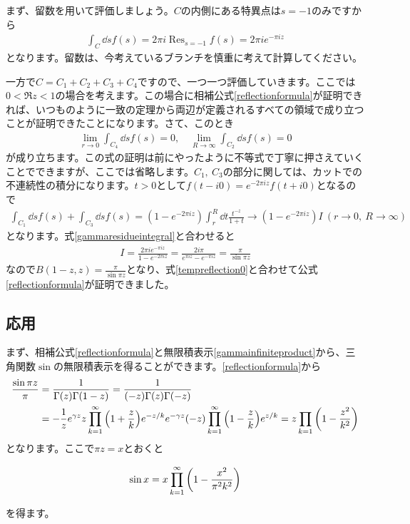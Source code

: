 \documentclass[report,paper=a4, fontsize=12pt, line_length=16cm, number_of_lines=33,dvipdfmx]{jlreq}
\newenvironment{important}{\begin{tcolorbox}[
  colback = white,
  colframe = red!35,
  boxrule = 2mm,
  fonttitle = \bfseries,
  after = \noindent] }{\end{tcolorbox}}
\numberwithin{equation}{section}
\DeclareMathOperator*{\Resi}{\mathrm{Res}}
\begin{document}
まず、留数を用いて評価しましょう。$C$の内側にある特異点は$s=-1$のみですから
\begin{align}
  \int_{C}\dd{s}f(s)=2\pi i \Resi_{s=-1}f(s)=2\pi i e^{-\pi i z}\label{gammaresidueintegral}
\end{align}
となります。留数は、今考えているブランチを慎重に考えて計算してください。

一方で$C=C_1+C_2+C_3+C_4$ですので、一つ一つ評価していきます。ここでは$0<\Re z <1$の場合を考えます。この場合に相補公式\eqref{reflectionformula}が証明できれば、いつものように一致の定理から両辺が定義されるすべての領域で成り立つことが証明できたことになります。さて、このとき
\begin{align}
  \lim_{r\to 0}\int_{C_4}\dd{s}f(s)=0,\quad
  \lim_{R\to \infty}\int_{C_2}\dd{s}f(s)=0
\end{align}
が成り立ちます。この式の証明は前にやったように不等式で丁寧に押さえていくことでできますが、ここでは省略します。$C_1,\ C_3$の部分に関しては、カットでの不連続性の積分になります。$t>0$として$f(t-i0)=e^{-2\pi i z}f(t+i0)$となるので
\begin{align}
  \int_{C_1}\dd{s}f(s)+\int_{C_3}\dd{s}f(s)
  =(1-e^{-2\pi i z})\int_{r}^{R}\dd{t}\frac{t^{-z}}{1+t}
  \to (1-e^{-2\pi i z})I\ (r\to 0,\ R\to \infty)
\end{align}
となります。式\eqref{gammaresidueintegral}と合わせると
\begin{align}
  I=\frac{2\pi i e^{-\pi i z}}{1-e^{-2\pi i z}}=\frac{2i\pi}{e^{\pi i z}-e^{-\pi i z}}=\frac{\pi}{\sin\pi z}
\end{align}
なので$B(1-z,z)=\frac{\pi}{\sin\pi z}$となり、式\eqref{tempreflection0}と合わせて公式\eqref{reflectionformula}が証明できました。

\subsection{応用}
まず、相補公式\eqref{reflectionformula}と無限積表示\eqref{gammainfiniteproduct}から、三角関数$\sin$の無限積表示を得ることができます。\eqref{reflectionformula}から
\begin{align}
  \frac{\sin \pi z}{\pi}
  &=\frac{1}{\Gamma(z)\Gamma(1-z)}
  =\frac{1}{(-z)\Gamma(z)\Gamma(-z)}\nonumber\\
  &=-\frac{1}{z}e^{\gamma z}z \prod_{k=1}^{\infty}\qty(1+\frac{z}{k})e^{-z/k}e^{-\gamma z}(-z)\prod_{k=1}^{\infty}\qty(1-\frac{z}{k})e^{z/k}
  =z\prod_{k=1}\qty(1-\frac{z^2}{k^2})
\end{align}
となります。ここで$\pi z=x$とおくと
\begin{important}
  \begin{align}
    \sin x = x \prod_{k=1}^{\infty}\qty(1-\frac{x^2}{\pi^2 k^2})
    \label{sininfiniteproduct}
  \end{align}
\end{important}
を得ます。
\end{document}

